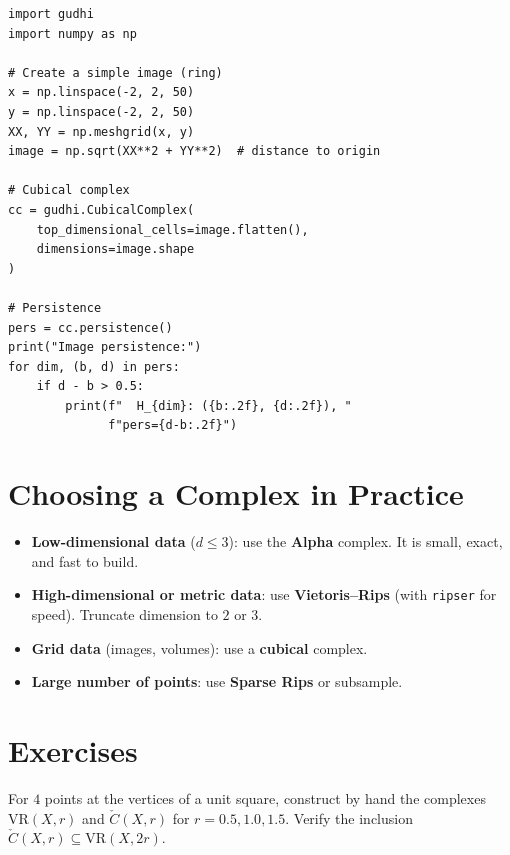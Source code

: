 \begin{codeblock}[title=\textbf{Persistent Homology of an Image}]
\begin{verbatim}
import gudhi
import numpy as np

# Create a simple image (ring)
x = np.linspace(-2, 2, 50)
y = np.linspace(-2, 2, 50)
XX, YY = np.meshgrid(x, y)
image = np.sqrt(XX**2 + YY**2)  # distance to origin

# Cubical complex
cc = gudhi.CubicalComplex(
    top_dimensional_cells=image.flatten(),
    dimensions=image.shape
)

# Persistence
pers = cc.persistence()
print("Image persistence:")
for dim, (b, d) in pers:
    if d - b > 0.5:
        print(f"  H_{dim}: ({b:.2f}, {d:.2f}), "
              f"pers={d-b:.2f}")
\end{verbatim}
\end{codeblock}

\section{Choosing a Complex in Practice}

\begin{algorithme}[title=\textbf{Complex Selection Guide}]
\begin{itemize}
  \item \textbf{Low-dimensional data} ($d \leq 3$): use the
        \textbf{Alpha} complex. It is small, exact, and fast to build.
  \item \textbf{High-dimensional or metric data}: use
        \textbf{Vietoris--Rips} (with \texttt{ripser} for speed).
        Truncate dimension to $2$ or $3$.
  \item \textbf{Grid data} (images, volumes): use a \textbf{cubical}
        complex.
  \item \textbf{Large number of points}: use \textbf{Sparse Rips} or
        subsample.
\end{itemize}
\end{algorithme}

\section{Exercises}

\begin{exercise}
For $4$ points at the vertices of a unit square, construct by hand the
complexes $\mathrm{VR}(X, r)$ and $\check{C}(X, r)$ for
$r = 0.5, 1.0, 1.5$. Verify the inclusion
$\check{C}(X, r) \subseteq \mathrm{VR}(X, 2r)$.
\end{exercise}

